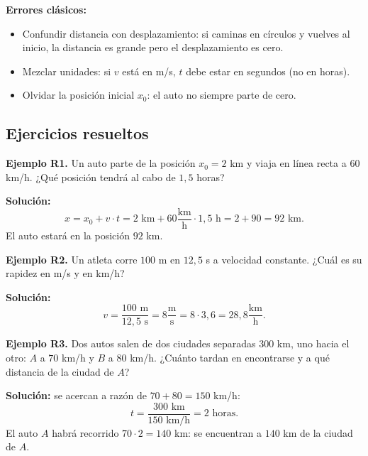 \documentclass[12pt, letterpaper]{article}
\begin{document}
\begin{cuadroadvertencia}
  \textbf{Errores clásicos:}
  \begin{itemize}[leftmargin=*]
    \item Confundir distancia con desplazamiento: si caminas en círculos y vuelves al inicio, la distancia es grande pero el desplazamiento es cero.
    \item Mezclar unidades: si $v$ está en m/s, $t$ debe estar en segundos (no en horas).
    \item Olvidar la posición inicial $x_0$: el auto no siempre parte de cero.
  \end{itemize}
\end{cuadroadvertencia}

\subsection{Ejercicios resueltos}

\textbf{Ejemplo R1.} Un auto parte de la posición $x_0 = 2$ km y viaja en línea recta a $60$ km/h. ¿Qué posición tendrá al cabo de $1{,}5$ horas?

\begin{cuadrosolucion}
  \textbf{Solución:}
  $$x = x_0 + v \cdot t = 2 \text{ km} + 60 \frac{\text{km}}{\text{h}} \cdot 1{,}5 \text{ h} = 2 + 90 = 92 \text{ km}.$$
  El auto estará en la posición $92$ km.
\end{cuadrosolucion}

\textbf{Ejemplo R2.} Un atleta corre $100$ m en $12{,}5$ s a velocidad constante. ¿Cuál es su rapidez en m/s y en km/h?

\begin{cuadrosolucion}
  \textbf{Solución:}
  $$v = \frac{100 \text{ m}}{12{,}5 \text{ s}} = 8 \frac{\text{m}}{\text{s}} = 8 \cdot 3{,}6 = 28{,}8 \frac{\text{km}}{\text{h}}.$$
\end{cuadrosolucion}

\textbf{Ejemplo R3.} Dos autos salen de dos ciudades separadas $300$ km, uno hacia el otro: $A$ a $70$ km/h y $B$ a $80$ km/h. ¿Cuánto tardan en encontrarse y a qué distancia de la ciudad de $A$?

\begin{cuadrosolucion}
  \textbf{Solución:} se acercan a razón de $70 + 80 = 150$ km/h:
  $$t = \frac{300 \text{ km}}{150 \text{ km/h}} = 2 \text{ horas}.$$
  El auto $A$ habrá recorrido $70 \cdot 2 = 140$ km: se encuentran a $140$ km de la ciudad de $A$.
\end{cuadrosolucion}
\end{document}
